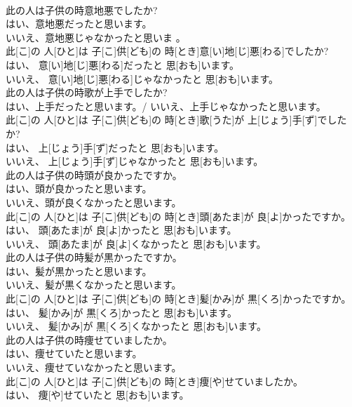 \documentclass[8pt]{extreport}
\begin{document}
\begin{CJK}{UTF8}{min}
\\	此の人は子供の時意地悪でしたか? 
\\	はい、意地悪だったと思います。 
\\	いいえ、意地悪じゃなかったと思いま 。	
\\	此[こ]の 人[ひと]は 子[こ]供[ども]の 時[とき]意[い]地[じ]悪[わる]でしたか? 
\\	はい、 意[い]地[じ]悪[わる]だったと 思[おも]います。 
\\	いいえ、 意[い]地[じ]悪[わる]じゃなかったと 思[おも]います。
\\	此の人は子供の時歌が上手でしたか? 
\\	はい、上手だったと思います。/ いいえ、上手じゃなかったと思います。	
\\	此[こ]の 人[ひと]は 子[こ]供[ども]の 時[とき]歌[うた]が 上[じょう]手[ず]でしたか? 
\\	はい、 上[じょう]手[ず]だったと 思[おも]います。 
\\	いいえ、 上[じょう]手[ず]じゃなかったと 思[おも]います。
\\	此の人は子供の時頭が良かったですか。 
\\	はい、頭が良かったと思います。 
\\	いいえ、頭が良くなかったと思います。	
\\	此[こ]の 人[ひと]は 子[こ]供[ども]の 時[とき]頭[あたま]が 良[よ]かったですか。 
\\	はい、 頭[あたま]が 良[よ]かったと 思[おも]います。 
\\	いいえ、 頭[あたま]が 良[よ]くなかったと 思[おも]います。
\\	此の人は子供の時髪が黒かったですか。 
\\	はい、髪が黒かったと思います。 
\\	いいえ、髪が黒くなかったと思います。	
\\	此[こ]の 人[ひと]は 子[こ]供[ども]の 時[とき]髪[かみ]が 黒[くろ]かったですか。 
\\	はい、 髪[かみ]が 黒[くろ]かったと 思[おも]います。 
\\	いいえ、 髪[かみ]が 黒[くろ]くなかったと 思[おも]います。
\\	此の人は子供の時痩せていましたか。 
\\	はい、痩せていたと思います。 
\\	いいえ、痩せていなかったと思います。	
\\	此[こ]の 人[ひと]は 子[こ]供[ども]の 時[とき]痩[や]せていましたか。 
\\	はい、 痩[や]せていたと 思[おも]います。 

\end{CJK}
\end{document}
